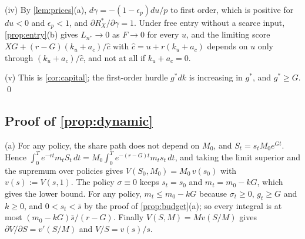 (iv) By \autoref{lem:prices}(a), $d\gamma=-(1-\epsilon_p)du/p$ to first order, which is positive for $du<0$ and $\epsilon_p<1$, and $\partial R_X^*/\partial\gamma=1$. Under free entry without a scarce input, \autoref{prop:entry}(b) gives $L_{n^*}\to 0$ as $F\to 0$ for every $u$, and the limiting score $XG+(r-G)(k_u+a_c)/\hat c$ with $\hat c=u+r(k_u+a_c)$ depends on $u$ only through $(k_u+a_c)/\hat c$, and not at all if $k_u+a_c=0$.

(v) This is \autoref{cor:capital}; the first-order hurdle $g^*dk$ is increasing in $g^*$, and $g^*\ge G$. \qed

\subsection*{Proof of \autoref{prop:dynamic}}

{\sloppy (a) For any policy, the share path does not depend on $M_0$, and $S_t=s_tM_0e^{Gt}$. Hence $\int_0^Te^{-rt}m_tS_t\,dt=M_0\int_0^Te^{-(r-G)t}m_ts_t\,dt$, and taking the limit superior and the supremum over policies gives $V(S_0,M_0)=M_0\,v(s_0)$ with $v(s):=V(s,1)$. The policy $\sigma\equiv 0$ keeps $s_t=s_0$ and $m_t=m_0-kG$, which gives the lower bound. For any policy, $m_t\le m_0-kG$ because $\sigma_t\ge 0$, $g_t\ge G$ and $k\ge 0$, and $0<s_t<\bar s$ by the proof of \autoref{prop:budget}(a); so every integral is at most $(m_0-kG)\bar s/(r-G)$. Finally $V(S,M)=Mv(S/M)$ gives $\partial V/\partial S=v'(S/M)$ and $V/S=v(s)/s$.\par}

